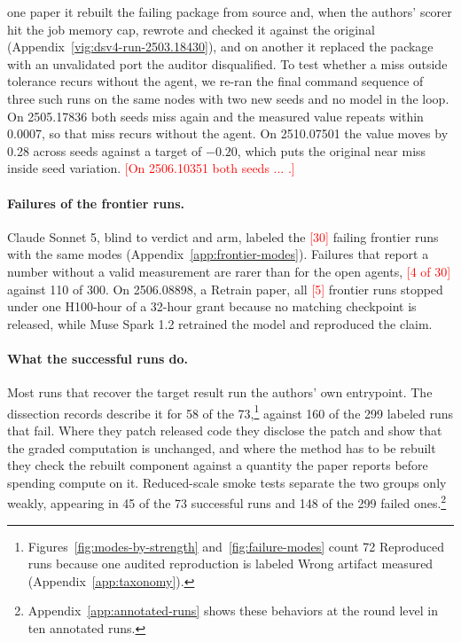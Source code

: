 \documentclass{article} %
\newcommand{\todo}[1]{\textcolor{red}{[#1]}}
\begin{document}
one paper it rebuilt the failing package from source and, when the authors' scorer hit the job memory cap, rewrote and checked it against the original (Appendix~\ref{vig:dsv4-run-2503.18430}), and on another
it replaced the package with an unvalidated port the auditor disqualified.
To test whether a miss outside tolerance recurs without the agent, we
re-ran the final command sequence of three such runs on the same nodes with
two new seeds and no model in the loop. On 2505.17836 both seeds miss again
and the measured value repeats within 0.0007, so that miss recurs without the
agent. On 2510.07501 the value moves by 0.28 across seeds against a target of
$-0.20$, which puts the original near miss inside seed variation.
\todo{On 2506.10351 both seeds ... .}

\paragraph{Failures of the frontier runs.}
Claude Sonnet 5, blind to verdict and arm, labeled the \todo{30} failing frontier runs
with the same modes (Appendix~\ref{app:frontier-modes}). Failures that report a
number without a valid measurement are rarer than for the open agents,
\todo{4 of 30} against 110 of 300. On 2506.08898, a Retrain paper,
all \todo{5} frontier runs stopped under one H100-hour of a 32-hour grant
because no matching checkpoint is released, while Muse Spark 1.2 retrained the
model and reproduced the claim.

\paragraph{What the successful runs do.}
Most runs that recover the target result run the authors' own entrypoint. The
dissection records describe it for 58 of the 73,\footnote{Figures~\ref{fig:modes-by-strength} and~\ref{fig:failure-modes} count 72 Reproduced runs because one audited reproduction is labeled Wrong artifact measured (Appendix~\ref{app:taxonomy}).} against 160 of the 299 labeled runs
that fail. Where they patch released code they disclose the patch and show
that the graded computation is unchanged, and where the method has to be
rebuilt they check the rebuilt component against a quantity the paper reports
before spending compute on it. Reduced-scale smoke tests separate the two
groups only weakly, appearing in 45 of the 73 successful runs
and 148 of the 299 failed ones.\footnote{Appendix~\ref{app:annotated-runs} shows
these behaviors at the round level in ten annotated runs.}
\end{document}
